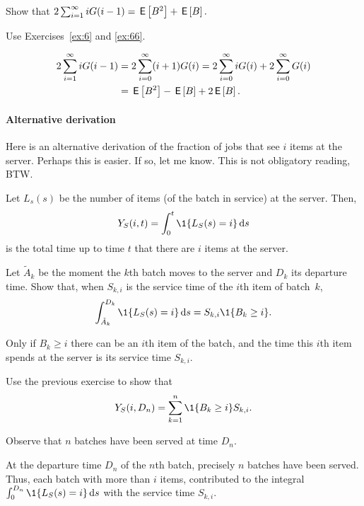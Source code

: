 \begin{exercise}\label{ex:ER}
  Show that $2 \sum_{i=1}^\infty i G(i-1)= \,\mathsf{E}\left[B^2\right] + \,\mathsf{E}\left[B\right].$
  \begin{hint}
    Use Exercises~\ref{ex:6} and \ref{ex:66}.
  \end{hint}
  \begin{solution}
\begin{equation*}
  \begin{split}
2 \sum_{i=1}^\infty i G(i-1) 
&=2\sum_{i=0}^\infty (i+1) G(i) 
=2\sum_{i=0}^\infty i G(i) +
2\sum_{i=0}^\infty G(i)\\
&= \,\mathsf{E}\left[B^2\right] - \,\mathsf{E}\left[B\right] + 2\,\mathsf{E}\left[B\right].
  \end{split}
\end{equation*}
  \end{solution}
\end{exercise}


\paragraph{Alternative derivation}
Here is an alternative derivation of the fraction of jobs that see $i$ items at the server. Perhaps this is easier. If so, let me know. This is not obligatory reading, BTW. 

Let $L_s(s)$ be the number of items (of the batch in service) at the server. Then, 
\begin{equation*}
  Y_S(i, t) = \int_0^t \1{L_S(s)=i} \d s
\end{equation*}
is the total time up to time $t$ that there are $i$ items at the server. 

\begin{exercise}
Let $\tilde A_k$ be the moment the $k$th batch moves to the server and $D_k$ its departure time. Show that, when $S_{k,i}$ is the service time of the $i$th item of batch~$k$,  
\begin{equation*}
  \int_{\tilde A_k}^{D_k} \1{L_S(s)=i} \d s = S_{k,i} \1{B_k \geq i}. 
\end{equation*}
\begin{solution}
Only if $B_k \geq i$ there can be an $i$th item of the batch, and the time this $i$th item spends at the server is its service time $S_{k,i}$.   
\end{solution}
\end{exercise}


\begin{exercise}\label{ex:14}
Use the previous exercise to show that 
\begin{equation*}
  Y_S(i, D_n) = \sum_{k=1}^n \1{B_k\geq i} S_{k,i}.
\end{equation*}
\begin{hint}
  Observe that $n$ batches have been served at time $D_n$.
\end{hint}
\begin{solution}
At the departure time $D_n$ of the $n$th batch, precisely $n$ batches have been served. Thus, each batch with more than $i$ items, contributed to the integral $\int_0^{D_n} \1{L_S(s) =i} \d s$ with the service time $S_{k,i}$. 
\end{solution}
\end{exercise}


